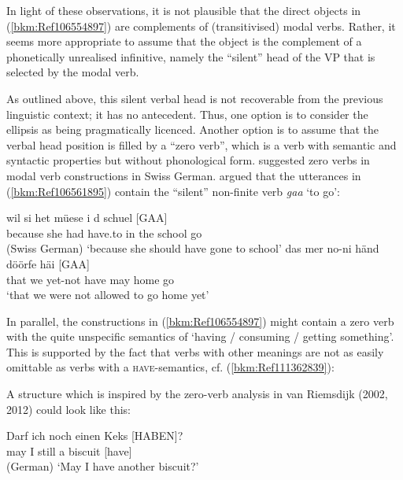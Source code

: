 \documentclass[output=paper
  ,nobabel
  ,draftmode
  ,colorlinks, citecolor=brown
]{langscibook}
\begin{document}
\noindent
In light of these observations, it is not plausible that the direct objects in
(\ref{bkm:Ref106554897}) are complements of (transitivised) modal verbs. Rather, it seems more
appropriate to assume that the object is the complement of a phonetically unrealised infinitive,
namely the ``silent'' head of the VP that is selected by the modal verb.

As outlined above, this silent verbal head is not recoverable from the previous linguistic context;
it has no antecedent. Thus, one option is to consider the ellipsis as being pragmatically
licenced. Another option is to assume that the verbal head position is filled by a ``zero verb'',
which is a verb with semantic and syntactic properties but without phonological
form.  suggested zero verbs in modal verb constructions in
Swiss German.  argued that the utterances in (\ref{bkm:Ref106561895})
contain the ``silent'' non-finite verb \emph{gaa} `to go':



\eal
\label{bkm:Ref106561895}
\ex
\gll wil           si    het    müese    i    d     schuel   [GAA]\\
       because   she  had  have.to  in   the  school  go\\\hfill(Swiss German)
\glt   `because she should have gone to school'
\ex
\gll das   mer  no-ni        händ  döörfe  häi       [GAA]\\
       that  we    yet-not    have  may      home   go \\
\glt   `that we were not allowed to go home yet'
\zl

\noindent
In parallel, the constructions in (\ref{bkm:Ref106554897}) might contain a zero verb with the quite
unspecific semantics of `having / consuming / getting something'. This is supported by the fact that
verbs with other meanings are not as easily omittable as verbs with a \textsc{have}{}-semantics,
cf. (\ref{bkm:Ref111362839}):

\z
\noindent
A structure which is inspired by the zero-verb analysis in van Riemsdijk (2002, 2012) could look
like this:

\eal
\label{bkm:Ref106563285}
\ex
\gll Darf  ich  noch  einen   Keks     [\MakeUppercase{haben}]?\\
       may  I      still    a          biscuit  [have]\\\hfill(German)
\glt   `May I have another biscuit?'
\end{document}
